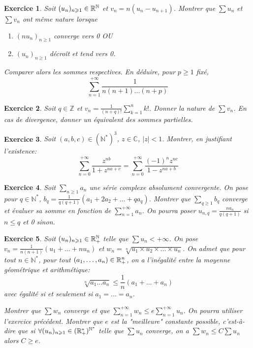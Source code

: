 \documentclass[12pt]{article}
\newtheorem{exercise}{Exercice}[section]
\theoremstyle{remark}
\theoremstyle{remark}
\newcommand{\C}{\mathbb{C}} \newcommand{\Q}{\mathbb{Q}}
\newcommand{\N}{\mathbb{N}} \newcommand{\Z}{\mathbb{Z}}
\begin{document}
\begin{exercise}
	Soit $(u_{n})_{n\geqslant1}\in\R^{\N}$ et $v_{n}=n(u_{n}-u_{n+1})$. Montrer
	que $\sum u_{n}$ et $\sum v_{n}$ ont même nature lorsque
	\begin{enumerate}
		\item
		[(i)] $(nu_{n})_{n\geqslant1}$ converge vers 0 OU
		\item
		[(ii)] $(u_{n})_{n\geqslant 1}$ décroît et tend vers 0.
	\end{enumerate}
	Comparer alors les sommes respectives. En déduire, pour $p\geqslant1$ fixé,
	$$\sum_{n=1}^{+\infty}\frac{1}{n(n+1)\dots(n+p)}$$
\end{exercise}

\begin{exercise}
	Soit $q\in\Z$ et $v_{n}=\frac{1}{(n+q)!}\sum_{k=1}^{n}k!$. Donner la nature de
	$\sum v_{n}$. En cas de divergence, donner un équivalent des sommes
	partielles.
\end{exercise}

\begin{exercise}
	Soit $(a,b,c)\in (\N^{*})^{3}$, $z\in\C$, $\vert z\vert<1$. Montrer, en
	justifiant l'existence:
	$$\sum_{n=0}^{+\infty}\frac{z^{nb}}{1+z^{na+c}}=\sum_{n=0}^{+\infty}\frac{(-1)^{n}z^{nc}}{1-z^{na+b}}$$
\end{exercise}

\begin{exercise}
	Soit $\sum_{n\geqslant1} a_{n}$ une série complexe absolument convergente. On
	pose pour $q\in\N^{*}$, $b_q=\frac{1}{q(q+1)}(a_{1}+2a_{2}+\dots+qa_{q})$.
	Montrer que $\sum_{q\geqslant1}b_{q}$ converge et évaluer sa somme en fonction
	de $\sum_{n=1}^{+\infty}a_{n}$. On pourra poser
	$u_{n,q}=\frac{na_{n}}{q(q+1)}$ si $n\leqslant q$ et 0 sinon.
\end{exercise}

\begin{exercise}
	Soit $(u_{n})_{n\geqslant1}\in\R_{+}^{\N}$ telle que $\sum u_{n}<+\infty$. On
	pose $v_{n}=\frac{1}{n(n+1)}(u_{1}+\dots+nu_{n})$ et $w_{n}=\sqrt[n]{u_1\times
	u_2\times\dots\times u_n}$. On admet que pour tout $n\in\N^{*}$, pour tout
	$(a_{1},\dots,a_{n})\in\mathbb{R}_{+}^{n}$, on a l'inégalité entre la moyenne
	géométrique et arithmétique:
	$$\sqrt[n]{a_{1}\dots a_{n}}\leqslant\frac{1}{n}(a_{1}+\dots+a_{n})$$ avec
	égalité si et seulement si $a_{1}=\dots=a_{n}$.

	Montrer que $\sum w_{n}$ converge et que $\sum_{n=1}^{+\infty}w_{n}\leqslant
	e\sum_{n=1}^{+\infty}u_{n}$. On pourra utiliser l'exercice précédent. Montrer
	que $e$ est la "meilleure" constante possible, c'est-à-dire que si $\forall
	(u_{n})_{n\geqslant1}\in(\R_{+}^{*})^{\N^{*}}$ telle que $\sum u_{n}$
	converge, on a $\sum w_{n}\leqslant C\sum u_{n}$ alors $C\geqslant e$.
\end{exercise}
\end{document}

